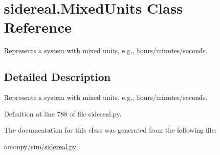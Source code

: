 \hypertarget{classsidereal_1_1_mixed_units}{\section{sidereal.\-Mixed\-Units Class Reference}
\label{classsidereal_1_1_mixed_units}
}


Represents a system with mixed units, e.\-g., hours/minutes/seconds.  




\subsection{Detailed Description}
Represents a system with mixed units, e.\-g., hours/minutes/seconds. 

Definition at line 788 of file sidereal.\-py.



The documentation for this class was generated from the following file\-:\begin{DoxyCompactItemize}
\item 
amonpy/sim/\hyperlink{sidereal_8py}{sidereal.\-py}\end{DoxyCompactItemize}
